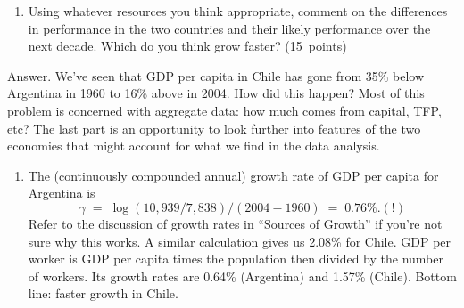 \documentclass[letterpaper,12pt]{article}
\begin{document}
\begin{enumerate}
\begin{enumerate}
\item Using whatever resources you think appropriate, 
comment on the differences in performance in the two countries 
and their likely performance over the next decade.  
Which do you think grow faster?  
(15~points) 

\end{enumerate}


Answer.  
We've seen that GDP per capita in Chile has gone 
from 35\% below Argentina in 1960 to 16\% above in 2004.
How did this happen?
Most of this problem is concerned with aggregate data:
how much comes from capital, TFP, etc?  
The last part is an opportunity to look further 
into features of the two economies that might account 
for what we find in the data analysis.  
%
\begin{enumerate}
\item The (continuously compounded annual) 
growth rate of GDP per capita for Argentina is 
\[
    \gamma \;=\; \log (10,939/7,838) / (2004 - 1960) \;=\; 0.76\%. (!) 
\]
Refer to the discussion of growth rates in ``Sources of Growth''
if you're not sure why this works.
A similar calculation gives us 2.08\% for Chile.  
GDP per worker is GDP per capita times the population then
divided by the number of workers.  
Its growth rates are 0.64\% (Argentina) and 1.57\% (Chile).  
Bottom line:  faster growth in Chile.  


\end{enumerate}
\end{enumerate}
\end{document}
